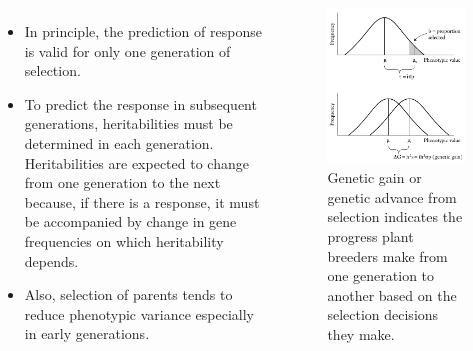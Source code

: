 \documentclass[11pt,ignorenonframetext,aspectratio=169]{beamer}
\providecommand{\tightlist}{%
  \setlength{\itemsep}{0pt}\setlength{\parskip}{0pt}}
\newcommand{\bcolumns}{\begin{columns}[T, onlytextwidth]}
\newcommand{\ecolumns}{\end{columns}}
\begin{document}
\begin{frame}{}
\protect\hypertarget{section-5}{}
\bcolumns
{}

\begin{itemize}
\tightlist
\item
  In principle, the prediction of response is valid for only one
  generation of selection.
\item
  To predict the response in subsequent generations, heritabilities must
  be determined in each generation. Heritabilities are expected to
  change from one generation to the next because, if there is a
  response, it must be accompanied by change in gene frequencies on
  which heritability depends.
\item
  Also, selection of parents tends to reduce phenotypic variance
  especially in early generations.
\end{itemize}


\begin{figure}

{\centering \includegraphics[width=0.7\linewidth]{./images/response_to_selection} 

}

\caption{Genetic gain or genetic advance from selection indicates the progress plant breeders make from one generation to another based on the selection decisions they make.}\label{fig:response-to-selection}
\end{figure}

\ecolumns
\end{frame}
\end{document}
